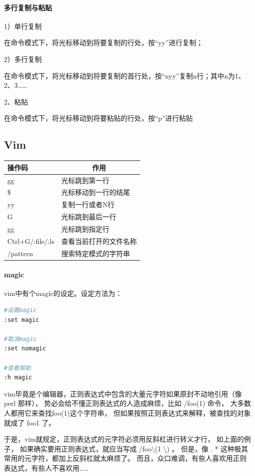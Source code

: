 \documentclass{book}
\begin{document}
\paragraph{多行复制与粘贴}

1）单行复制

在命令模式下，将光标移动到将要复制的行处，按“yy”进行复制；

2）多行复制

在命令模式下，将光标移动到将要复制的首行处，按“nyy”复制n行；其中n为1、2、3……

2、粘贴

在命令模式下，将光标移动到将要粘贴的行处，按“p”进行粘贴

\subsection{Vim}

\begin{tabular}{l|p{10cm}}
	\multirow{1}{*}{操作码}			
	& \multicolumn{1}{c}{作用}\\	 
	\hline
	gg & 光标跳到第一行\\
	\hline
	\$ & 光标移动到一行的结尾\\
	\hline
	[N]yy & 复制一行或者N行\\
	\hline
	G & 光标跳到最后一行\\
	\hline
	[n]gg & 光标跳到指定行\\
	\hline
	Ctrl+G/:file/:ls & 查看当前打开的文件名称\\
	\hline
	/pattern & 搜索特定模式的字符串\\
	\hline
\end{tabular}

\paragraph{magic}vim中有个magic的设定。设定方法为：

\begin{lstlisting}[language=Bash]
#设置magic
:set magic

#取消magic
:set nomagic

#查看帮助
:h magic
\end{lstlisting}

vim毕竟是个编辑器，正则表达式中包含的大量元字符如果原封不动地引用（像perl 那样）， 势必会给不懂正则表达式的人造成麻烦，比如 /foo(1) 命令， 大多数人都用它来查找foo(1)这个字符串， 但如果按照正则表达式来解释，被查找的对象就成了 foo1 了。

于是，vim就规定，正则表达式的元字符必须用反斜杠进行转义才行， 如上面的例子，
如果确实要用正则表达式，就应当写成 /foo\textbackslash (1 \textbackslash) 。 
但是，像 . * 这种极其常用的元字符，都加上反斜杠就太麻烦了。 
而且，众口难调，有些人喜欢用正则表达式，有些人不喜欢用……
\end{document}

